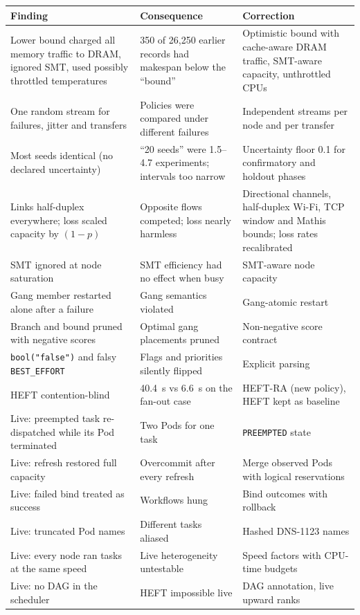 \documentclass[12pt,a4paper]{report}
\begin{document}
\begin{longtable}{L{4.2cm}L{4.6cm}L{4.8cm}}
\toprule
Finding & Consequence & Correction \\
\midrule
\endhead
Lower bound charged all memory traffic to DRAM, ignored SMT, used possibly throttled temperatures & 350 of 26,250 earlier records had makespan below the ``bound'' & Optimistic bound with cache-aware DRAM traffic, SMT-aware capacity, unthrottled CPUs \\
One random stream for failures, jitter and transfers & Policies were compared under different failures & Independent streams per node and per transfer \\
Most seeds identical (no declared uncertainty) & ``20 seeds'' were 1.5--4.7 experiments; intervals too narrow & Uncertainty floor 0.1 for confirmatory and holdout phases \\
Links half-duplex everywhere; loss scaled capacity by $(1-p)$ & Opposite flows competed; loss nearly harmless & Directional channels, half-duplex Wi-Fi, TCP window and Mathis bounds; loss rates recalibrated \\
SMT ignored at node saturation & SMT efficiency had no effect when busy & SMT-aware node capacity \\
Gang member restarted alone after a failure & Gang semantics violated & Gang-atomic restart \\
Branch and bound pruned with negative scores & Optimal gang placements pruned & Non-negative score contract \\
\texttt{bool("false")} and falsy \texttt{BEST\_EFFORT} & Flags and priorities silently flipped & Explicit parsing \\
HEFT contention-blind & 40.4~s vs 6.6~s on the fan-out case & HEFT-RA (new policy), HEFT kept as baseline \\
Live: preempted task re-dispatched while its Pod terminated & Two Pods for one task & \texttt{PREEMPTED} state \\
Live: refresh restored full capacity & Overcommit after every refresh & Merge observed Pods with logical reservations \\
Live: failed bind treated as success & Workflows hung & Bind outcomes with rollback \\
Live: truncated Pod names & Different tasks aliased & Hashed DNS-1123 names \\
Live: every node ran tasks at the same speed & Live heterogeneity untestable & Speed factors with CPU-time budgets \\
Live: no DAG in the scheduler & HEFT impossible live & DAG annotation, live upward ranks \\

\end{longtable}
\end{document}
